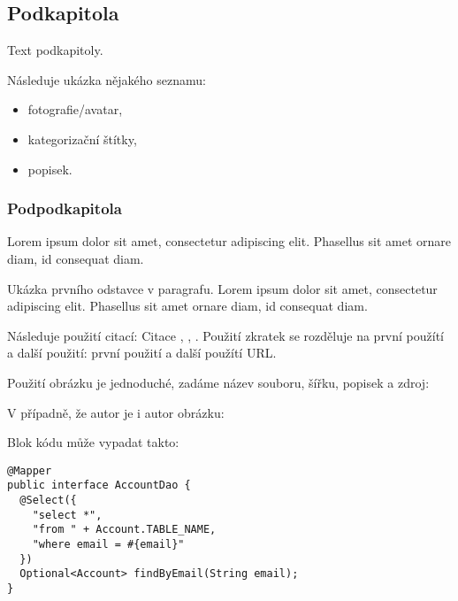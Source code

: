 	\subsection{Podkapitola}

	Text podkapitoly.

	Následuje ukázka nějakého seznamu:
	\begin{itemize}
		\item fotografie/avatar,
		\item kategorizační štítky,
		\item popisek.
	\end{itemize}

		\subsubsection{Podpodkapitola}

		Lorem ipsum dolor sit amet, consectetur adipiscing elit. Phasellus sit amet ornare diam, id consequat diam.


			\noindent Ukázka prvního odstavce v paragrafu. Lorem ipsum dolor sit amet, consectetur adipiscing elit. Phasellus sit amet ornare diam, id consequat diam.

			Následuje použití citací: Citace \cite{html_hypertext_markup_language}, \cite{hibernate_docs}, \cite{ddd_quickly}.
			Použití zkratek se rozděluje na první použítí a další použití: první použití  a další použítí \ac{URL}.

			Použití obrázku je jednoduché, zadáme název souboru, šířku, popisek a zdroj:


			V případně, že autor je i autor obrázku:


			Blok kódu může vypadat takto:

			\begin{codeblock}
				\begin{verbatim}
@Mapper
public interface AccountDao {
  @Select({
    "select *",
    "from " + Account.TABLE_NAME,
    "where email = #{email}"
  })
  Optional<Account> findByEmail(String email);
}
				\end{verbatim}
			\end{codeblock}

